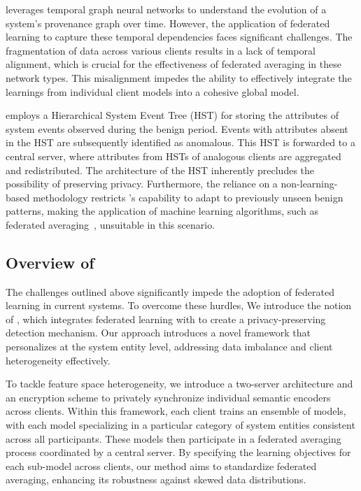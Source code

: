 \kairos leverages temporal graph neural networks to understand the evolution of a system's provenance graph over time. However, the application of federated learning to capture these temporal dependencies faces significant challenges. The fragmentation of data across various clients results in a lack of temporal alignment, which is crucial for the effectiveness of federated averaging in these network types. This misalignment impedes the ability to effectively integrate the learnings from individual client models into a cohesive global model.

 \disdet employs a Hierarchical System Event Tree (HST) for storing the attributes of system events observed during the benign period. Events with attributes absent in the HST are subsequently identified as anomalous. This HST is forwarded to a central server, where attributes from HSTs of analogous clients are aggregated and redistributed. The architecture of the HST inherently precludes the possibility of preserving privacy. Furthermore, the reliance on a non-learning-based methodology restricts \disdet's capability to adapt to previously unseen benign patterns, making the application of machine learning algorithms, such as federated averaging~\cite{mcmahan2017communication}, unsuitable in this scenario.


\subsection{Overview of \Sys}
The challenges outlined above significantly impede the adoption of federated learning in current systems. To overcome these hurdles, We introduce the notion of \fpgl , which integrates federated learning with \grl to create a privacy-preserving detection mechanism. Our approach introduces a novel framework that personalizes \grl at the system entity level, addressing data imbalance and client heterogeneity effectively.

To tackle feature space heterogeneity, we introduce a two-server architecture and an encryption scheme to privately synchronize individual semantic encoders across clients. Within this framework, each client trains an ensemble of \gnnshort models, with each model specializing in a particular category of system entities consistent across all participants. These models then participate in a federated averaging process coordinated by a central server. By specifying the learning objectives for each sub-model across clients, our method aims to standardize federated averaging, enhancing its robustness against skewed data distributions.

